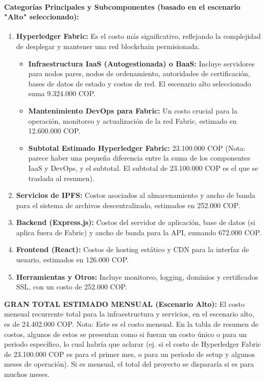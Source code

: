 \documentclass[
    letterpaper, 
    man,   
    spanish,
    12pt,
    donotrepeattitle,
    floatsintext,
    hidelinks %
]{apa7}
\begin{document}
\paragraph{Categorías Principales y Subcomponentes (basado en el escenario "Alto" seleccionado): }

\begin{enumerate}
\item \textbf{Hyperledger Fabric:} Es el costo más significativo, reflejando la complejidad de desplegar y mantener una red blockchain permisionada. 

\begin{itemize}
\item \textbf{Infraestructura IaaS (Autogestionada) o BaaS:} Incluye servidores para nodos pares, nodos de ordenamiento, autoridades de certificación, bases de datos de estado y costos de red. El escenario alto seleccionado suma 9.324.000 COP. 

\item \textbf{Mantenimiento DevOps para Fabric:} Un costo crucial para la operación, monitoreo y actualización de la red Fabric, estimado en 12.600.000 COP. 

\item\textbf{Subtotal Estimado Hyperledger Fabric:} 23.100.000 COP (Nota: parece haber una pequeña diferencia entre la suma de los componentes IaaS y DevOps, y el subtotal. El subtotal de 23.100.000 COP es el que se traslada al resumen). 
\end{itemize}
\item \textbf{Servicios de IPFS:} Costos asociados al almacenamiento y ancho de banda para el 		sistema de archivos descentralizado, estimados en 252.000 COP. 

\item \textbf{Backend (Express.js):} Costos del servidor de aplicación, base de datos (si aplica fuera de Fabric) y ancho de banda para la API, sumando 672.000 COP. 

\item \textbf{Frontend (React):} Costos de hosting estático y CDN para la interfaz de usuario, estimados en 126.000 COP. 

\item \textbf{Herramientas y Otros:} Incluye monitoreo, logging, dominios y certificados SSL, con un costo de 252.000 COP. 
\end{enumerate}
 

\textbf{GRAN TOTAL ESTIMADO MENSUAL (Escenario Alto):} El costo mensual recurrente total para la infraestructura y servicios, en el escenario alto, es de 24.402.000 COP. Nota: Este es el costo mensual. En la tabla de resumen de costos, algunos de estos se presentan como si fueran un costo único o para un periodo específico, lo cual habría que aclarar (ej. si el costo de Hyperledger Fabric de 23.100.000 COP es para el primer mes, o para un periodo de setup y algunos meses de operación). Si es mensual, el total del proyecto se dispararía si es para muchos meses. 
\end{document}

